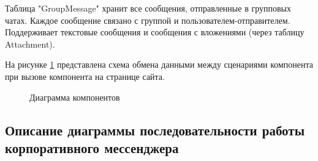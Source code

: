 Таблица "GroupMessage" хранит все сообщения, отправленные в групповых чатах. Каждое сообщение связано с группой и пользователем-отправителем. Поддерживает текстовые сообщения и сообщения с вложениями (через таблицу Attachment).

На рисунке \ref{data:image} представлена схема обмена данными между сценариями компонента при вызове компонента на странице сайта.

\begin{figure}[H]
\caption{Диаграмма компонентов}
\label{data:image}
\end{figure}

\subsection{Описание диаграммы последовательности работы корпоративного мессенджера}

